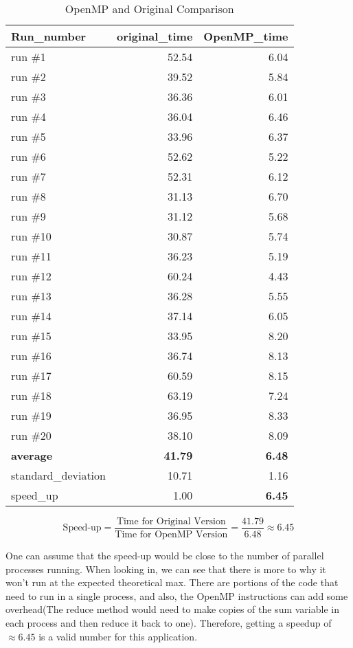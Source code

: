 \documentclass{article}
\newcommand{\zonenorm}{\textit{$Z$-score normalization}}
\begin{document}
\begin{table}[h]
 \caption{OpenMP and Original Comparison}
 \label{tab:comparison}
 \centering
 \begin{tabular}{lrr}
 \toprule
 Run\_number & original\_time & OpenMP\_time \\
 \midrule
 run \#1 & 52.54 & 6.04 \\
 run \#2 & 39.52 & 5.84 \\
 run \#3 & 36.36 & 6.01 \\
 run \#4 & 36.04 & 6.46 \\
 run \#5 & 33.96 & 6.37 \\
 run \#6 & 52.62 & 5.22 \\
 run \#7 & 52.31 & 6.12 \\
 run \#8 & 31.13 & 6.70 \\
 run \#9 & 31.12 & 5.68 \\
 run \#10 & 30.87 & 5.74 \\
 run \#11 & 36.23 & 5.19 \\
 run \#12 & 60.24 & 4.43 \\
 run \#13 & 36.28 & 5.55 \\
 run \#14 & 37.14 & 6.05 \\
 run \#15 & 33.95 & 8.20 \\
 run \#16 & 36.74 & 8.13 \\
 run \#17 & 60.59 & 8.15 \\
 run \#18 & 63.19 & 7.24 \\
 run \#19 & 36.95 & 8.33 \\
 run \#20 & 38.10 & 8.09 \\
 \textbf{average} & \textbf{41.79} & \textbf{6.48} \\
 standard\_deviation & 10.71 & 1.16 \\
 speed\_up & 1.00 & \textbf{6.45} \\
 \bottomrule
 \end{tabular}
\end{table}

\[
\text{Speed-up} = \frac{\text{Time for Original Version}}{\text{Time for OpenMP Version}} = \frac{41.79}{6.48} \approx 6.45
\]

One can assume that the speed-up would be close to the number of parallel processes running. When looking in, we can see that there is more to why it won't run at the expected theoretical max. There are portions of the code that need to run in a single process, and also, the OpenMP instructions can add some overhead(The reduce method would need to make copies of the sum variable in each process and then reduce it back to one). 
Therefore, getting a speedup of $\approx 6.45 $ is a valid number for this application.  
\end{document}
